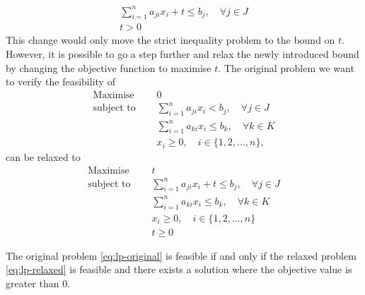 \documentclass[runningheads]{llncs}
\begin{document}
\begin{align*}
    \sum_{i=1}^{n} a_{ji}x_{i} + t \le b_j, \quad \forall j \in J \\
    t > 0
\end{align*}
This change would only move the strict inequality problem to the bound on $t$.
However, it is possible to go a step further and relax the newly introduced bound by changing the objective function to maximise $t$.
The original problem we want to verify the feasibility of
\begin{equation}
    \label{eq:lp-original}
    \begin{split}
        \text{Maximise }   \quad & 0                                                          \\
        \text{subject to } \quad & \sum_{i=1}^{n} a_{ji}x_{i} < b_j,   \quad \forall j \in J  \\
        \quad                    & \sum_{i=1}^{n} a_{ki}x_{i} \le b_k,  \quad \forall k \in K \\
                                 & x_i \ge 0,  \quad i \in \{1, 2, \ldots, n\},
    \end{split}
\end{equation}
can be relaxed to
\begin{equation}
    \label{eq:lp-relaxed}
    \begin{split}
        \text{Maximise }   \quad & t                                                             \\
        \text{subject to } \quad & \sum_{i=1}^{n} a_{ji}x_{i} + t \le b_j, \quad \forall j \in J \\
        \quad                    & \sum_{i=1}^{n} a_{ki}x_{i} \le b_k, \quad \forall k \in K     \\
                                 & x_i \ge 0 , \quad i \in \{1, 2, \ldots, n\}                   \\
                                 & t \ge 0
    \end{split}
\end{equation}

\begin{theorem}
    \label{thm:lp-relaxed}
    The original problem \eqref{eq:lp-original} is feasible if and only if the relaxed problem \eqref{eq:lp-relaxed} is feasible and there exists a solution where the objective value is greater than $0$.
\end{theorem}
\end{document}
